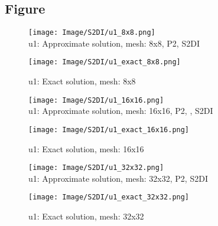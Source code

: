 \documentclass[a4paper,11pt]{article}
\begin{document}
\newpage
\subsection{Figure}

\begin{figure}[bhpt]
  \hspace{35.pt}
  \begin{minipage}[t]{0.4 \textwidth}
    \centering
    \texttt{[image: Image/S2DI/u1\_8x8.png]}\\
    \caption{u1: Approximate solution, mesh: 8x8, P2, S2DI}\label{fig:fig_P2_u1_8x8}
  \end{minipage}
  \hspace{0.1in}
  \begin{minipage}[t]{0.4 \textwidth}
    \centering
    \texttt{[image: Image/S2DI/u1\_exact\_8x8.png]}\\
    \caption{u1: Exact solution, mesh: 8x8}\label{fig:fig_P2u1_exact_8x8}
  \end{minipage}
\end{figure}
\begin{figure}[bhpt]
  \hspace{35.pt}
  \begin{minipage}[t]{0.4 \textwidth}
    \centering
    \texttt{[image: Image/S2DI/u1\_16x16.png]}\\
    \caption{u1: Approximate solution, mesh: 16x16, P2, , S2DI}\label{fig:fig_P2_u1_16x16}
  \end{minipage}
  \hspace{0.1in}
  \begin{minipage}[t]{0.4 \textwidth}
    \centering
    \texttt{[image: Image/S2DI/u1\_exact\_16x16.png]}\\
    \caption{u1: Exact solution, mesh: 16x16}\label{fig:fig_P2u1_exact_16x16}
  \end{minipage}
\end{figure}
\begin{figure}[bhtp]
  \hspace{35.pt}
  \begin{minipage}[t]{0.4 \textwidth}
    \centering
    \texttt{[image: Image/S2DI/u1\_32x32.png]}\\
    \caption{u1: Approximate solution, mesh: 32x32, P2, S2DI}\label{fig:fig_P2_u1_32x32}
  \end{minipage}
  \hspace{0.1in}
  \begin{minipage}[t]{0.4 \textwidth}
    \centering
    \texttt{[image: Image/S2DI/u1\_exact\_32x32.png]}\\
    \caption{u1: Exact solution, mesh: 32x32}\label{fig:fig_P2u1_exact_32x32}
  \end{minipage}
\end{figure}
\end{document}
